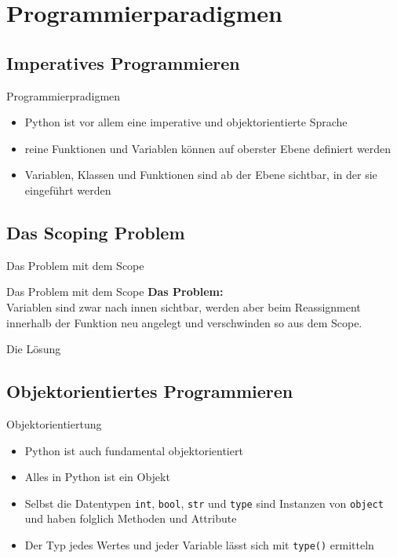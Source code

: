 \section{Programmierparadigmen}
\subsection{Imperatives Programmieren}
\begin{frame}[fragile]{Programmierpradigmen}
	\begin{itemize}
		\item Python ist vor allem eine imperative und objektorientierte Sprache
		\item reine Funktionen und Variablen können auf oberster Ebene definiert werden
		\item Variablen, Klassen und Funktionen sind ab der Ebene sichtbar, in der sie eingeführt werden
	\end{itemize}
\end{frame}

\subsection{Das Scoping Problem}
\begin{frame}[fragile]{Das Problem mit dem Scope}
	
\end{frame}

\begin{frame}{Das Problem mit dem Scope}
	\textbf{\alert{Das Problem:}} \\[.25cm]
	Variablen sind zwar nach innen sichtbar, werden aber beim Reassignment innerhalb der Funktion neu angelegt und verschwinden so aus dem Scope.
\end{frame}

\begin{frame}[fragile]{Die Lösung}
	
\end{frame}

\subsection{Objektorientiertes Programmieren}
\begin{frame}[fragile]{Objektorientiertung}
	\begin{itemize}
		\item Python ist auch fundamental objektorientiert
		\item Alles in Python ist ein Objekt
		\item Selbst die Datentypen \texttt{int}, \texttt{bool}, \texttt{str} und \texttt{type} sind Instanzen von \texttt{object} und haben folglich Methoden und Attribute
		\item Der Typ jedes Wertes und jeder Variable lässt sich mit \alert{\texttt{type()}} ermitteln
	\end{itemize}
\end{frame}

